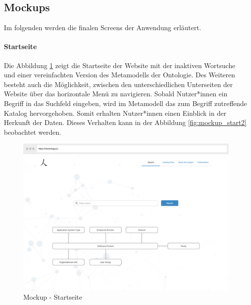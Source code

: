 \subsection{Mockups}

Im folgenden werden die finalen Screens der Anwendung erläutert.

\paragraph{Startseite}

Die Abbildung \ref{fig:mockup_start1} zeigt die Startseite der Website mit der inaktiven Wortsuche und einer vereinfachten Version des Metamodells der Ontologie.
Des Weiteren besteht auch die Möglichkeit, zwischen den unterschiedlichen Unterseiten der Website über das horizontale Menü zu navigieren.
Sobald Nutzer*innen ein Begriff in das Suchfeld eingeben, wird im Metamodell das zum Begriff zutreffende Katalog hervorgehoben.
Somit erhalten Nutzer*innen einen Einblick in der Herkunft der Daten.
Dieses Verhalten kann in der Abbildung \ref{fig:mockup_start2} beobachtet werden.

\begin{figure}[H]
	\centering
    	\includegraphics[width=\textwidth]{Images/Mockup_Startseite_1}
   	\caption{Mockup - Startseite}
   	\label{fig:mockup_start1}
\end{figure}

